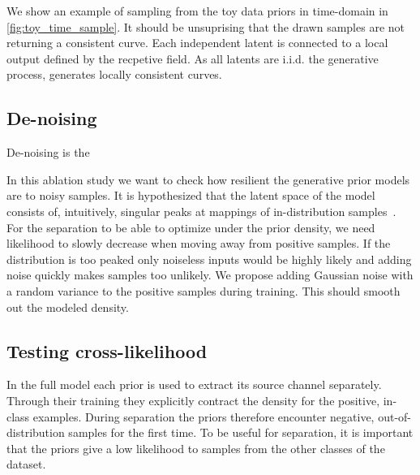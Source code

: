 We show an example of sampling from the toy data priors in time-domain in \cref{fig:toy_time_sample}. It should be unsuprising that the drawn samples are not returning a consistent curve. Each independent latent is connected to a local output defined by the recpetive field. As all latents are i.i.d. the generative process, generates locally consistent curves.


\subsection{De-noising}

De-noising is the

In this ablation study we want to check how resilient the generative prior models are to noisy samples. It is hypothesized that the latent space of the model consists of, intuitively, singular peaks at mappings of in-distribution samples~\cite{jayaramSource2020}. For the separation to be able to optimize under the prior density, we need likelihood to slowly decrease when moving away from positive samples. If the distribution is too peaked only noiseless inputs would be highly likely and adding noise quickly makes samples too unlikely. We propose adding Gaussian noise with a random variance to the positive samples during training. This should smooth out the modeled density.


\subsection{Testing cross-likelihood}
In the full model each prior is used to extract its source channel separately. Through their training they explicitly contract the density for the positive, in-class examples. During separation the priors therefore encounter negative, out-of-distribution samples for the first time. To be useful for separation, it is important that the priors give a low likelihood to samples from the other classes of the dataset.

